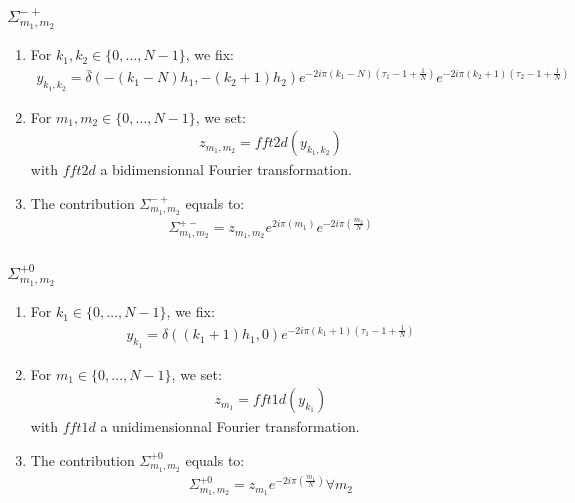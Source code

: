 \subsubsection{$\Sigma_{m_1,m_2}^{-+}$}

\begin{enumerate}
\item For $k_1,k_2\in\{0,\hdots,N-1\}$, we fix:
\begin{align*}
y_{k_1,k_2}= \bar{\delta}(-(k_1-N)h_1,-(k_2+1)h_2)e^{-2i\pi (k_1-N)\left(\tau_1-1+\frac{1}{N}\right)}e^{-2i\pi (k_2+1)\left(\tau_2-1+\frac{1}{N}\right)}
\end{align*}
\item For $m_1,m_2\in\{0,\hdots,N-1\}$, we set:
\begin{align*}
  z_{m_1,m_2}=fft2d(y_{k_1,k_2})
\end{align*}
with $fft2d$ a bidimensionnal Fourier transformation.
\item The contribution $\Sigma_{m_1,m_2}^{-+}$ equals to:
\begin{align*}
  \Sigma_{m_1,m_2}^{+-}=z_{m_1,m_2}e^{2i\pi\left(m_1\right)}e^{-2i\pi\left(\frac{m_2}{N}\right)}
\end{align*}
\end{enumerate}


\subsubsection{$\Sigma_{m_1,m_2}^{+0}$}
\begin{enumerate}
\item For $k_1\in\{0,\hdots,N-1\}$, we fix:
\begin{align*}
y_{k_1}= \delta((k_1+1)h_1,0)e^{-2i\pi (k_1+1)\left(\tau_1-1+\frac{1}{N}\right)}
\end{align*}
\item For $m_1\in\{0,\hdots,N-1\}$, we set:
\begin{align*}
  z_{m_1}=fft1d(y_{k_1})
\end{align*}
with $fft1d$ a unidimensionnal Fourier transformation.
\item The contribution $\Sigma_{m_1,m_2}^{+0}$ equals to:
\begin{align*}
  \Sigma_{m_1,m_2}^{+0}=z_{m_1}e^{-2i\pi\left(\frac{m_1}{N}\right)} \forall m_2
\end{align*}
\end{enumerate}

